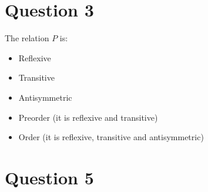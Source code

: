 \documentclass[a4paper, fleqn]{article}
\begin{document}
\section*{Question 3}
The relation $P$ is:
\begin{itemize}
 \item Reflexive
 \item Transitive
 \item Antisymmetric
 \item Preorder (it is reflexive and transitive)
 \item Order (it is reflexive, transitive and antisymmetric)
\end{itemize}

\section*{Question 5}
\end{document}
